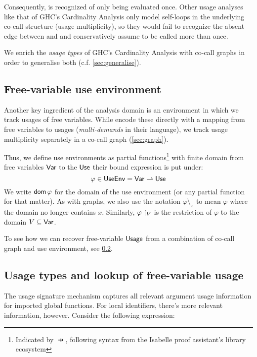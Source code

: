 Consequently,  is recognized of only being evaluated once. 
Other usage analyses like that of GHC's Cardinality Analysis \parencite{card} only model self-loops in the underlying co-call structure (\eg usage multiplicity), so they would fail to recognize the absent edge between  and  and conservatively assume  to be called more than once.


We enrich the \emph{usage types} of GHC's Cardinality Analysis \parencite{card} with co-call graphs in order to generalise both (c.f. \cref{sec:generalise}).

\subsection{Free-variable use environment}\label{sec:useenv}

Another key ingredient of the analysis domain is an environment in which we track usages of free variables.
While \textcite{card} encode these directly with a mapping from free variables to usages (\emph{multi-demands} in their language), we track usage multiplicity separately in a co-call graph (\cref{sec:graph}).

Thus, we define use environments as partial functions\footnote{Indicated by $\pfun$, following syntax from the Isabelle proof assistant's library ecosystem} with finite domain from free variables $\text{\textsf{Var}}$ to the $\text{\textsf{Use}}$ their bound expression is put under:
\[
\varphi \in \text{\textsf{UseEnv}} = \text{\textsf{Var}} \rightharpoonup \text{\textsf{Use}}
\]
We write $\mathsf{dom}\,\varphi$ for the domain of the use environment (or any partial function for that matter).
As with graphs, we also use the notation $\varphi \setminus_x$ to mean $\varphi$ where the domain no longer contains $x$.
Similarly, $\varphi\restriction_{V}$ is the restriction of $\varphi$ to the domain $V \subseteq \text{\textsf{Var}}$.

To see how we can recover free-variable $\text{\textsf{Usage}}$ from a combination of co-call graph and use environment, see \cref{sec:utype}.

\subsection{Usage types and lookup of free-variable usage}\label{sec:utype}

The usage signature mechanism captures all relevant argument usage information for imported global functions.
For local identifiers, there's more relevant information, however.
Consider the following expression:

